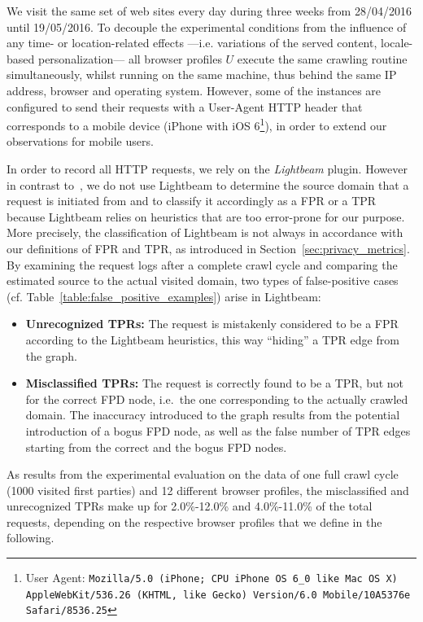 \documentclass[compsoc, conference, letterpaper, 10pt, times]{IEEEtran}
\begin{document}
We visit the same set of web sites every day during three weeks from 28/04/2016 until 19/05/2016. To decouple the experimental conditions from the influence of any time- or location-related effects ---i.e. variations of the served content, locale-based personalization--- all browser profiles $U$ execute the same crawling routine simultaneously, whilst running on the same machine, thus behind the same IP address, browser and operating system. However, some of the instances are configured to send their requests with a User-Agent HTTP header that corresponds to a mobile device (iPhone with iOS 6\footnote{User Agent: \texttt{Mozilla/5.0 (iPhone; CPU iPhone OS 6\_0 like Mac OS X) AppleWebKit/536.26 (KHTML, like Gecko) Version/6.0 Mobile/10A5376e Safari/8536.25}}), in order to extend our observations for mobile users.

In order to record all HTTP requests, we rely on the \textit{Lightbeam} plugin. However in contrast to~\cite{ruffel2015}, we do not use Lightbeam to determine the source domain that a request is initiated from and to classify it accordingly as a FPR or a TPR because Lightbeam relies on heuristics that are too error-prone for our purpose.
More precisely, the classification of Lightbeam is not always in accordance with our definitions of FPR and TPR, as introduced in Section~\ref{sec:privacy_metrics}. By examining the request logs after a complete crawl cycle and comparing the estimated source to the actual visited domain, two types of false-positive cases (cf. Table~\ref{table:false_positive_examples}) arise in Lightbeam:

\begin{itemize}
\item \textbf{Unrecognized TPRs:} The request is mistakenly considered to be a FPR according to the Lightbeam heuristics, this way ``hiding'' a TPR edge from the graph.
\item \textbf{Misclassified TPRs:} The request is correctly found to be a TPR, but not for the correct FPD node, i.e.\ the one corresponding to the actually crawled domain. The inaccuracy introduced to the graph results from the potential introduction of a bogus FPD node, as well as the false number of TPR edges starting from the correct and the bogus FPD nodes.
\end{itemize}

As results from the experimental evaluation on the data of one full crawl cycle (1000 visited first parties) and 12 different browser profiles, the misclassified and unrecognized TPRs make up for 2.0\%-12.0\% and 4.0\%-11.0\% of the total requests, depending on the respective browser profiles that we define in the following.
\end{document}
